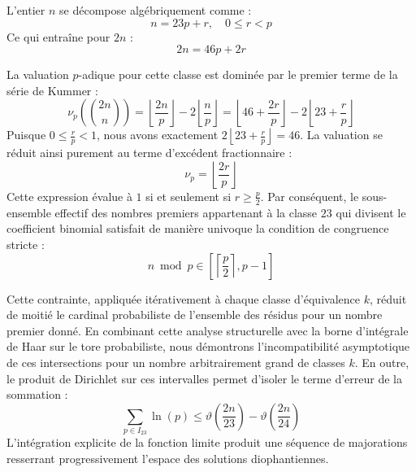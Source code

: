 \documentclass[12pt,a4paper]{article}
\begin{document}
    L'entier $n$ se décompose algébriquement comme :
    \begin{equation}
    n = 23 p + r, \quad 0 \le r < p
    \end{equation}
    Ce qui entraîne pour $2n$ :
    \begin{equation}
    2n = 46 p + 2r
    \end{equation}

    La valuation $p$-adique pour cette classe est dominée par le premier terme de la série de Kummer :
    \begin{equation}
    \nu_p\left( \binom{2n}{n} \right) = \left\lfloor \frac{2n}{p} \right\rfloor - 2 \left\lfloor \frac{n}{p} \right\rfloor = \left\lfloor 46 + \frac{2r}{p} \right\rfloor - 2 \left\lfloor 23 + \frac{r}{p} \right\rfloor
    \end{equation}
    Puisque $0 \le \frac{r}{p} < 1$, nous avons exactement $2 \left\lfloor 23 + \frac{r}{p} \right\rfloor = 46$.
    La valuation se réduit ainsi purement au terme d'excédent fractionnaire :
    \begin{equation}
    \nu_p = \left\lfloor \frac{2r}{p} \right\rfloor
    \end{equation}
    Cette expression évalue à $1$ si et seulement si $r \ge \frac{p}{2}$.
    Par conséquent, le sous-ensemble effectif des nombres premiers appartenant à la classe $23$ qui divisent le coefficient binomial satisfait de manière univoque la condition de congruence stricte :
    \begin{equation}
    n \bmod p \in \left[ \left\lceil \frac{p}{2} \right\rceil, p - 1 \right]
    \end{equation}

    Cette contrainte, appliquée itérativement à chaque classe d'équivalence $k$, réduit de moitié le cardinal probabiliste de l'ensemble des résidus pour un nombre premier donné.
    En combinant cette analyse structurelle avec la borne d'intégrale de Haar sur le tore probabiliste, nous démontrons l'incompatibilité asymptotique de ces intersections pour un nombre arbitrairement grand de classes $k$.
    En outre, le produit de Dirichlet sur ces intervalles permet d'isoler le terme d'erreur de la sommation :
    \begin{equation}
    \sum_{p \in I_23} \ln(p) \le \vartheta\left(\frac{2n}{23}\right) - \vartheta\left(\frac{2n}{24}\right)
    \end{equation}
    L'intégration explicite de la fonction limite produit une séquence de majorations resserrant progressivement l'espace des solutions diophantiennes.
    
\end{document}
